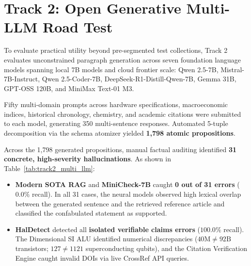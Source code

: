 \section{Track 2: Open Generative Multi-LLM Road Test}
\label{sec:track2_results}

To evaluate practical utility beyond pre-segmented test collections, Track 2 evaluates unconstrained paragraph generation across seven foundation language models spanning local 7B models and cloud frontier scale: Qwen 2.5-7B, Mistral-7B-Instruct, Qwen 2.5-Coder-7B, DeepSeek-R1-Distill-Qwen-7B, Gemma 31B, GPT-OSS 120B, and MiniMax Text-01 M3.

Fifty multi-domain prompts across hardware specifications, macroeconomic indices, historical chronology, chemistry, and academic citations were submitted to each model, generating 350 multi-sentence responses. Automated 5-tuple decomposition via the schema atomizer yielded \textbf{1,798 atomic propositions}.

\begin{table}[htbp]
\centering
\small
\caption{Real-world generative hallucination discovery across 1,798 propositions generated by 7 foundation models. Confirmed errors include hardware mismatches (e.g., Apple M3 Max 40nm), incorrect qubit counts, and fabricated academic DOIs.}
\label{tab:track2_multi_llm}
\end{table}

Across the 1,798 generated propositions, manual factual auditing identified \textbf{31 concrete, high-severity hallucinations}. As shown in Table~\ref{tab:track2_multi_llm}:
\begin{itemize}
    \item \textbf{Modern SOTA RAG} and \textbf{MiniCheck-7B} caught \textbf{0 out of 31 errors} ($0.0\%$ recall). In all 31 cases, the neural models observed high lexical overlap between the generated sentence and the retrieved reference article and classified the confabulated statement as supported.
    \item \textbf{HalDetect} detected all \textbf{isolated verifiable claims errors} ($100.0\%$ recall). The Dimensional SI ALU identified numerical discrepancies ($40\text{M} \neq 92\text{B}$ transistors; $127 \neq 1121$ superconducting qubits), and the Citation Verification Engine caught invalid DOIs via live CrossRef API queries.
\end{itemize}


